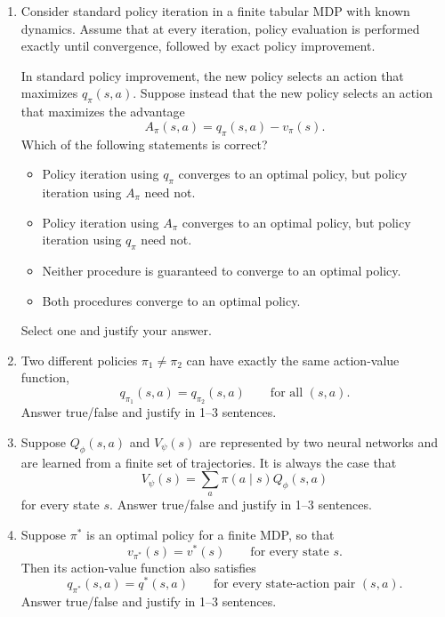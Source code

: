 \documentclass[12pt]{article}
\begin{document}
\begin{enumerate}[
    leftmargin=2.8cm,
    labelwidth=2.3cm,
    labelsep=0.5cm,
    align=left
]

  \item[\textbf{1. (2 pts)}] Consider standard policy iteration in a finite tabular MDP with known
  dynamics. Assume that at every iteration, policy evaluation is performed
  exactly until convergence, followed by exact policy improvement.

  In standard policy improvement, the new policy selects an action that
  maximizes $q_\pi(s,a)$. Suppose instead that the new policy selects an action
  that maximizes the advantage
  \[
    A_\pi(s,a) = q_\pi(s,a) - v_\pi(s).
  \]
  Which of the following statements is correct?
  \begin{itemize}
    \item Policy iteration using $q_\pi$ converges to an optimal policy, but
    policy iteration using $A_\pi$ need not.
    \item Policy iteration using $A_\pi$ converges to an optimal policy, but
    policy iteration using $q_\pi$ need not.
    \item Neither procedure is guaranteed to converge to an optimal policy.
    \item Both procedures converge to an optimal policy.
  \end{itemize}
  Select one and justify your answer.

  \item[\textbf{2. (2 pts)}] Two different policies $\pi_1 \neq \pi_2$ can have exactly the same
  action-value function,
  \[
    q_{\pi_1}(s,a) = q_{\pi_2}(s,a)
    \qquad
    \text{for all } (s,a).
  \]
  Answer true/false and justify in 1--3 sentences.


  \item[\textbf{3. (2 pts)}] Suppose $Q_\phi(s,a)$ and $V_\psi(s)$ are represented by two neural
  networks and are learned from a finite set of trajectories. It is always the
  case that
  \[
    V_\psi(s)
    =
    \sum_a \pi(a \mid s) Q_\phi(s,a)
  \]
  for every state $s$.
  Answer true/false and justify in 1--3 sentences.


  \item[\textbf{4. (2 pts)}] Suppose $\pi^*$ is an optimal policy for a finite MDP, so that
  \[
    v_{\pi^*}(s) = v^*(s)
    \qquad
    \text{for every state } s.
  \]
  Then its action-value function also satisfies
  \[
    q_{\pi^*}(s,a) = q^*(s,a)
    \qquad
    \text{for every state-action pair } (s,a).
  \]
  Answer true/false and justify in 1--3 sentences.



\end{enumerate}
\end{document}
